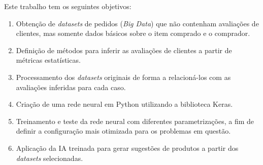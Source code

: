 Este trabalho tem os seguintes objetivos:

\begin{enumerate}
\item Obtenção de \textit{datasets} de pedidos (\textit{Big Data}) que não contenham avaliações de clientes, mas somente dados básicos sobre o item comprado e o comprador. 
\item Definição de métodos para inferir as avaliações de clientes a partir de métricas estatísticas.
\item Processamento dos \textit{datasets} originais de forma a relacioná-los com as avaliações inferidas para cada caso.
\item Criação de uma rede neural em Python utilizando a biblioteca Keras.
\item Treinamento e teste da rede neural com diferentes parametrizações, a fim de definir a configuração mais otimizada para os problemas em questão.
\item Aplicação da IA treinada para gerar sugestões de produtos a partir dos \textit{datasets} selecionadas.
\end{enumerate}